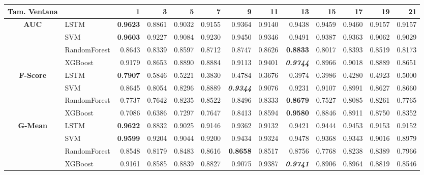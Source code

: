 \begin{table}[H]
	\centering
	\begin{adjustbox}{max width=14cm}
		\begin{tabular}{|c|l|r|r|r|r|r|r|r|r|r|r|r|}
			
			\hline
			\textbf{Tam. Ventana}&         &      1  &      3  &      5  &      7  &      9  &      11 &      13 &      15 &      17 &      19 &      21 \\
			\hline
			\textbf{AUC} & LSTM &  \textbf{0.9623} &  0.8861 &  0.9032 &  0.9155 &  0.9364 &  0.9140 &  0.9438 &  0.9459 &  0.9460 &  0.9157 &  0.9157 \\
			& SVM &  \textbf{0.9603} &  0.9227 &  0.9084 &  0.9230 &  0.9450 &  0.9346 &  0.9491 &  0.9387 &  0.9363 &  0.9062 &  0.9029 \\
			& RandomForest &  0.8643 &  0.8339 &  0.8597 &  0.8712 &  0.8747 &  0.8626 &  \textbf{0.8833} &  0.8017 &  0.8393 &  0.8519 &  0.8173 \\
			& XGBoost &  0.9179 &  0.8653 &  0.8890 &  0.8884 &  0.9113 &  0.9401 &  \textit{\textbf{0.9744}} &  0.8966 &  0.9018 &  0.8889 &  0.8651 \\
			\hline
			\textbf{F-Score} & LSTM &  \textbf{0.7907} &  0.5846 &  0.5221 &  0.3830 &  0.4784 &  0.3676 &  0.3974 &  0.3986 &  0.4280 &  0.4923 &  0.5000 \\
			& SVM &  0.8645 &  0.8054 &  0.8296 &  0.8889 &  \textit{\textbf{0.9344}} &  0.9076 &  0.9231 &  0.9107 &  0.8991 &  0.8627 &  0.8660 \\
			& RandomForest &  0.7737 &  0.7642 &  0.8235 &  0.8522 &  0.8496 &  0.8333 &  \textbf{0.8679} &  0.7527 &  0.8085 &  0.8261 &  0.7765 \\
			& XGBoost &  0.7086 &  0.6386 &  0.7297 &  0.7647 &  0.8413 &  0.8594 &  \textbf{0.9580} &  0.8846 &  0.8911 &  0.8750 &  0.8352 \\
			\hline
			\textbf{G-Mean} & LSTM &  \textbf{0.9622} &  0.8832 &  0.9025 &  0.9146 &  0.9362 &  0.9132 &  0.9421 &  0.9444 &  0.9453 &  0.9153 &  0.9152 \\
			& SVM &  \textbf{0.9599} &  0.9204 &  0.9044 &  0.9200 &  0.9434 &  0.9324 &  0.9478 &  0.9368 &  0.9343 &  0.9016 &  0.8979 \\
			& RandomForest &  0.8548 &  0.8179 &  0.8483 &  0.8616 &  \textbf{0.8658} &  0.8517 &  0.8756 &  0.7768 &  0.8238 &  0.8389 &  0.7966 \\
			& XGBoost &  0.9161 &  0.8585 &  0.8839 &  0.8827 &  0.9075 &  0.9387 &  \textit{\textbf{0.9741}} &  0.8906 &  0.8964 &  0.8819 &  0.8546 \\

\end{tabular}
\end{adjustbox}
\end{table}
